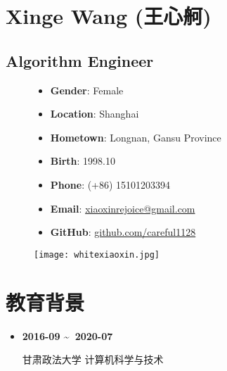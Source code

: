\documentclass[11pt,a4paper]{article}
\begin{document}
\section*{Xinge Wang (王心舸)}
\subsection*{Algorithm Engineer}

\begin{figure}[h!]
    \begin{minipage}[c]{0.7\textwidth}  %
        \begin{itemize}[leftmargin=*,noitemsep,topsep=0pt]
            \item \textbf{Gender}: Female 
            \item \textbf{Location}: Shanghai
            \item \textbf{Hometown}: Longnan, Gansu Province  
            \item \textbf{Birth}: 1998.10
            \item \textbf{Phone}: (+86) 15101203394
            \item \textbf{Email}: \href{mailto:xiaoxinrejoice@gmail.com}{xiaoxinrejoice@gmail.com} 
            \item \textbf{GitHub}: \href{https://github.com/careful1128}{github.com/careful1128}
        \end{itemize}
    \end{minipage}%
    \hfill  %
    \begin{minipage}[c]{0.25\textwidth}  %
        \raggedleft  %
        \texttt{[image: whitexiaoxin.jpg]} 
    \end{minipage}
\end{figure}

\section*{教育背景}
\begin{itemize}[leftmargin=*,noitemsep,topsep=3pt]
    \item \textbf{2016-09 \textasciitilde\ 2020-07} \\
    \begin{minipage}[t]{\linewidth}
        甘肃政法大学
        \hfill
        计算机科学与技术
    \end{minipage}
\end{itemize}
\end{document}
